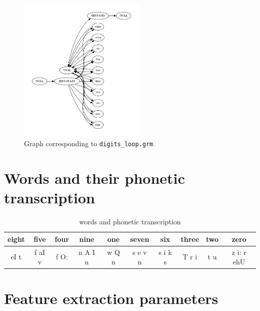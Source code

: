 \documentclass[onecolumn]{article}
\begin{document}
\begin{figure}[htbp]
    \centering
    \includegraphics[height=7cm]{digit_loop}
    \caption{Graph corresponding to \texttt{digits\_loop.grm}}
    \label{fig:digit_loop_graph}
\end{figure}

\section*{Words and their phonetic transcription}
\begin{table}[htbp]
\begin{tabular}{|c|c|c|c|c|c|c|c|c|c|}
\hline
eight & five & four & nine & one & seven & six & three & two & zero \\ \hline
eI t  & f aI v  & f O:  & n A I n  & w Q n  & s e v n  & s i k s  & T r i  & t u  & z i: r ehU  \\ \hline
\end{tabular}
\caption{words and phonetic transcription}
\end{table}
\clearpage

\section*{Feature extraction parameters}

\end{document}
